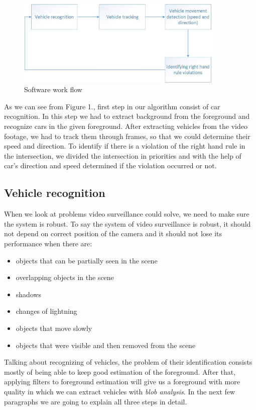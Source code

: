 \documentclass[12pt]{article} %
\begin{document}
\begin{figure}[ht]
\centering
\includegraphics[width=10cm]{Drawing1.jpg}
\caption{Software work flow}
\end{figure}

As we can see from Figure 1., first step in our algorithm consist of car recognition. In this step we had to extract background from the foreground and recognize cars in the given foreground. After extracting vehicles from the video footage, we had to track them through frames, so that we could determine their speed and direction. To identify if there is a violation of the right hand rule in the intersection, we divided the intersection in priorities and with the help of car's direction and speed determined if the violation occurred or not.


\subsection{Vehicle recognition} %

When we look at problems video surveillance could solve, we need to make sure the system is robust. To say the system of video surveillance is robust, it should not depend on correct position of the camera and it should not lose its performance when there are:

\begin{itemize}
\item objects that can be partially seen in the scene
\item overlapping objects in the scene
\item shadows
\item changes of lightning
\item objects that move slowly
\item objects that were visible and then removed from the scene
\end{itemize}

Talking about recognizing of vehicles, the problem of their identification consists mostly of being able to keep good estimation of the foreground. After that, applying filters to foreground estimation will give us a foreground with more quality in which we can extract vehicles with \textit{blob analysis}.
In the next few paragraphs we are going to explain all three steps in detail.
\end{document}
